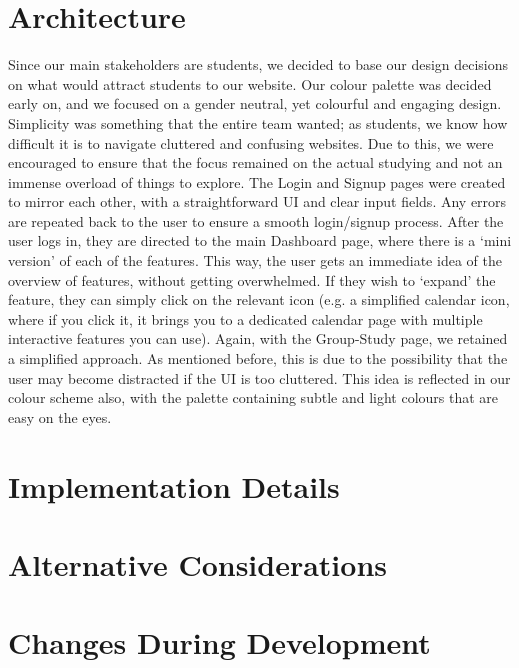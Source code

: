 \section{Architecture}
\label{sect:architecture}

Since our main stakeholders are students, we decided to base our design decisions on what would attract students to our website. Our colour palette was decided early on, and we focused on a gender neutral, yet colourful and engaging design. Simplicity was something that the entire team wanted; as students, we know how difficult it is to navigate cluttered and confusing websites. Due to this, we were encouraged to ensure that the focus remained on the actual studying and not an immense overload of things to explore. The Login and Signup pages were created to mirror each other, with a straightforward UI and clear input fields. Any errors are repeated back to the user to ensure a smooth login/signup process. After the user logs in, they are directed to the main Dashboard page, where there is a ‘mini version’ of each of the features. This way, the user gets an immediate idea of the overview of features, without getting overwhelmed. If they wish to ‘expand’ the feature, they can simply click on the relevant icon (e.g. a simplified calendar icon, where if you click it, it brings you to a dedicated calendar page with multiple interactive features you can use). Again, with the Group-Study page, we retained a simplified approach. As mentioned before, this is due to the possibility that the user may become distracted if the UI is too cluttered. This idea is reflected in our colour scheme also, with the palette containing subtle and light colours that are easy on the eyes.

\section{Implementation Details}
\label{sect:implementation-details}

\section{Alternative Considerations}
\label{sect:alternative-considerations}

\section{Changes During Development}
\label{sect:changes-during-development}